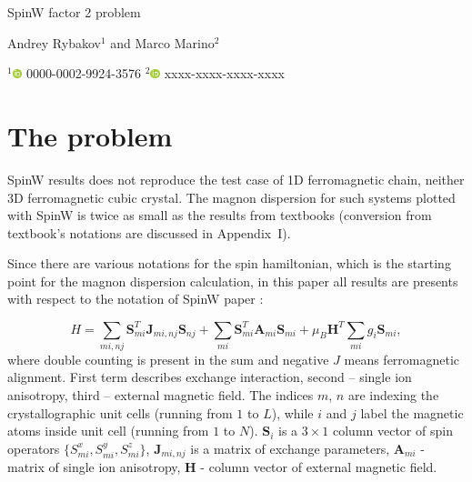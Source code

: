 \documentclass[a4paper,12pt]{article}
\newcommand{\orcid}[1]{\href{https://orcid.org/#1}{\includegraphics[height=8pt]{orcid_16x16.png}} #1}
\begin{document}
    \begin{center}
    \centering \LARGE SpinW factor 2 problem

    \vspace{1cm}
    \small Andrey Rybakov$^1$ and Marco Marino$^2$

    \footnotesize $^1$\orcid{0000-0002-9924-3576}
    \footnotesize $^2$\orcid{xxxx-xxxx-xxxx-xxxx}
    \end{center}

    \section{The problem}

        SpinW \cite{SpinW} results does not reproduce the test case of 1D ferromagnetic chain, neither 3D ferromagnetic cubic crystal. 
        The magnon dispersion for such systems plotted with SpinW is twice as small as the results from textbooks 
        \cite{rezende2020fundamentals, blundell2003magnetism, gurevich1996magnetization, simon2013oxford, coey2010magnetism, jensen1991rare, white1983quantum} (conversion from textbook's notations are discussed in Appendix~I). 

        Since there are various notations for the spin hamiltonian, which is the starting point for the magnon dispersion calculation, 
        in this paper all results are presents with respect to the notation of SpinW paper \cite{toth2015linear}:

        \begin{equation}
            H = \sum_{mi,nj}\boldsymbol{S}^T_{mi}\boldsymbol{J}_{mi, nj}\boldsymbol{S}_{nj} + 
            \sum_{mi}\boldsymbol{S}^T_{mi}\boldsymbol{A}_{mi}\boldsymbol{S}_{mi} + 
            \mu_B\boldsymbol{H}^T\sum_{mi}g_i\boldsymbol{S}_{mi},
        \end{equation}
        where double counting is present in the sum and negative $J$ means ferromagnetic alignment. 
        First term describes exchange interaction, second -- single ion anisotropy, third -- external magnetic field.
        The indices $m$, $n$ are indexing the crystallographic unit cells (running from $1$ to $L$), while $i$ and $j$ label the magnetic atoms inside unit cell (running from $1$ to $N$).
        $\boldsymbol{S}_i$ is a $3 \times 1$ column vector of spin operators $\{S_{mi}^x, S_{mi}^y, S_{mi}^z\}$, 
        $\boldsymbol{J}_{mi, nj}$ is a matrix of exchange parameters, $\boldsymbol{A}_{mi}$ - matrix of single ion anisotropy,  
        $\boldsymbol{H}$ - column vector of external magnetic field. 
\end{document}
